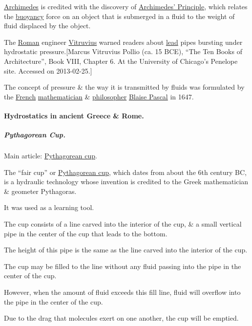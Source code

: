 \documentclass{article}
\begin{document}
\href{https://en.wikipedia.org/wiki/Archimedes}{Archimedes} is credited with the discovery of \href{https://en.wikipedia.org/wiki/Archimedes'_Principle}{Archimedes' Principle}, which relates the \href{https://en.wikipedia.org/wiki/Buoyancy}{buoyancy} force on an object that is submerged in a fluid to the weight of fluid displaced by the object.

The \href{https://en.wikipedia.org/wiki/Roman_Empire}{Roman} engineer \href{https://en.wikipedia.org/wiki/Vitruvius}{Vitruvius} warned readers about \href{https://en.wikipedia.org/wiki/Lead}{lead} pipes bursting under hydrostatic pressure.[Marcus Vitruvius Pollio (ca. 15 BCE), ``The Ten Books of Architecture'', Book VIII, Chapter 6. At the University of Chicago's Penelope site. Accessed on 2013-02-25.]

%
The concept of pressure \& the way it is transmitted by fluids was formulated by the \href{https://en.wikipedia.org/wiki/France}{French} \href{https://en.wikipedia.org/wiki/Mathematician}{mathematician} \& \href{https://en.wikipedia.org/wiki/Philosopher}{philosopher} \href{https://en.wikipedia.org/wiki/Blaise_Pascal}{Blaise Pascal} in 1647.

\paragraph{Hydrostatics in ancient Greece \& Rome.}

\subparagraph{Pythagorean Cup.} Main article: \href{https://en.wikipedia.org/wiki/Pythagorean_cup}{Pythagorean cup}.

%
The ``fair cup'' or \href{https://en.wikipedia.org/wiki/Pythagorean_cup}{Pythagorean cup}, which dates from about the 6th century BC, is a hydraulic technology whose invention is credited to the Greek mathematician \& geometer Pythagoras.

It was used as a learning tool.

%
The cup consists of a line carved into the interior of the cup, \& a small vertical pipe in the center of the cup that leads to the bottom.

The height of this pipe is the same as the line carved into the interior of the cup.

The cup may be filled to the line without any fluid passing into the pipe in the center of the cup.

However, when the amount of fluid exceeds this fill line, fluid will overflow into the pipe in the center of the cup.

Due to the drag that molecules exert on one another, the cup will be emptied.
\end{document}
